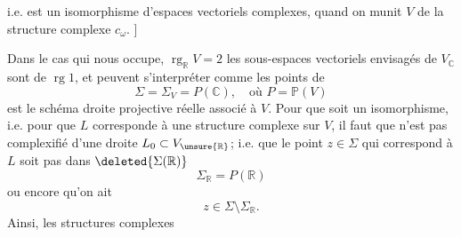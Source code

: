 i.e.
est un isomorphisme d'espaces vectoriels complexes, quand on munit $V$ de la structure complexe $c_\omega$. ]


Dans le cas qui nous occupe, $\operatorname{rg}_{\mathbb R}V=2$ les  sous-espaces vectoriels envisagés de $V_{\mathbb C}$ sont de  $\operatorname{rg}1$,  et peuvent s'interpréter comme les points de
\begin{equation}
\Sigma=\Sigma_V=P(\mathbb C),\quad\text{où }P=\mathbb P(V)
\tag{16}
\end{equation}
est le  schéma droite projective réelle associé à $V$. Pour que
soit un isomorphisme, i.e. pour que $L$ corresponde à une structure complexe  sur $V$, il faut que   n'est pas complexifié d'une droite $L_0\subset V_{\unsure{\mathbb R}}$; i.e. que le point $z\in\Sigma$ qui correspond à $L$  soit pas dans $\deleted{\Sigma(\mathbb R)}$
\[
\Sigma_{\mathbb R}=P(\mathbb R)
\]
ou encore qu'on ait
\begin{equation}
z\in\Sigma\setminus\Sigma_{\mathbb R}.
\tag{17}
\end{equation}
 Ainsi, les structures complexes
